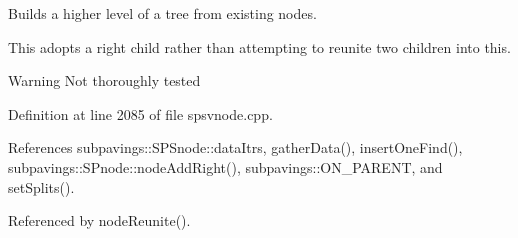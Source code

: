 \-Builds a higher level of a tree from existing nodes. 

\-This adopts a right child rather than attempting to reunite two children into this. \begin{DoxyWarning}{\-Warning}
\-Not thoroughly tested 
\end{DoxyWarning}


\-Definition at line 2085 of file spsvnode.\-cpp.



\-References subpavings\-::\-S\-P\-Snode\-::data\-Itrs, gather\-Data(), insert\-One\-Find(), subpavings\-::\-S\-Pnode\-::node\-Add\-Right(), subpavings\-::\-O\-N\-\_\-\-P\-A\-R\-E\-N\-T, and set\-Splits().



\-Referenced by node\-Reunite().


